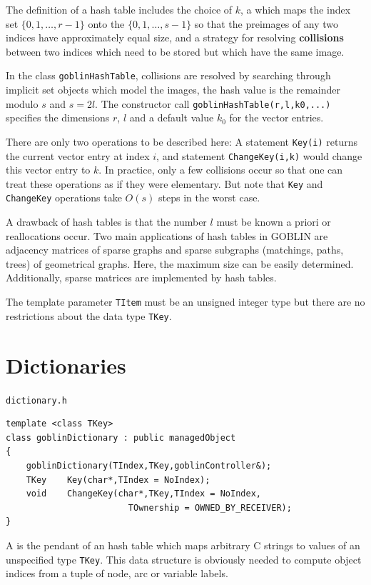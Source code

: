 \documentclass[a4paper,11pt,twoside]{book}
\begin{document}
\begin{multicols}{2}
The definition of a hash table includes the choice of $k$, a 
which maps the index set $\{0,1,\dots,r-1\}$ onto the $\{0,1,\dots,s-1\}$ so
that the preimages of any two indices have approximately equal size, and a
strategy for resolving {\bf collisions} between
two indices which need to be stored but which have the same image.

In the class \verb/goblinHashTable/, collisions are resolved by searching
through implicit set objects which model the images, the hash value is the
remainder modulo $s$ and $s=2l$. The constructor call
\verb/goblinHashTable(r,l,k0,...)/ specifies the dimensions $r$, $l$ and
a default value $k_0$ for the vector entries.

There are only two operations to be described here: A statement \verb/Key(i)/
returns the current vector entry at index $i$, and statement
\verb/ChangeKey(i,k)/ would change this vector entry to $k$.
In practice, only a few collisions occur so that one can treat these
operations as if they were elementary. But note that \verb/Key/ and
\verb/ChangeKey/ operations take $O(s)$ steps in the worst case.

A drawback of hash tables is that the number $l$ must be known a priori or
reallocations occur. Two main applications of hash tables in GOBLIN are
adjacency matrices of sparse graphs and sparse subgraphs (matchings, paths,
trees) of geometrical graphs. Here, the maximum size can be easily determined.
Additionally, sparse matrices are implemented by hash tables.

The template parameter \verb/TItem/ must be an unsigned integer type but there
are no restrictions about the data type \verb/TKey/.


\section{Dictionaries}
\myinclude\verb/dictionary.h/
\begin{mymethods}
\begin{verbatim}
template <class TKey>
class goblinDictionary : public managedObject
{
    goblinDictionary(TIndex,TKey,goblinController&);
    TKey    Key(char*,TIndex = NoIndex);
    void    ChangeKey(char*,TKey,TIndex = NoIndex,
                        TOwnership = OWNED_BY_RECEIVER);
}
\end{verbatim}
\end{mymethods}
A  is the pendant of an hash table which maps arbitrary C
strings to values of an unspecified type \verb/TKey/. This data structure is
obviously needed to compute object indices from a tuple of node, arc or
variable labels.


\end{multicols}
\end{document}
